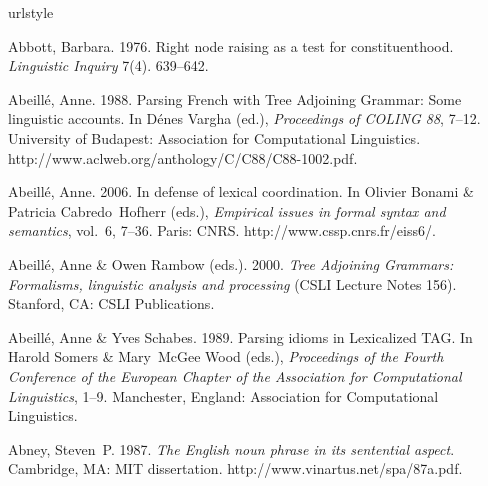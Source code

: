\providecommand{\noopsort}[1]{} \providecommand*{\donothing}[1]{}
  \providecommand*{\printsecond}[2]{#2}
\begin{thebibliography}{1420}
\providecommand{\natexlab}[1]{#1}
\providecommand{\url}[1]{#1}
\providecommand{\urlprefix}{}
\expandafter\ifx\csname urlstyle\endcsname\relax
  \providecommand{\doi}[1]{doi:\discretionary{}{}{}#1}\else
  \providecommand{\doi}{doi:\discretionary{}{}{}\begingroup
  \urlstyle{rm}\Url}\fi

\makeatletter

    \@clubpenalty \clubpenalty
\makeatother

  
Abbott, Barbara. 1976.
\newblock Right node raising as a test for constituenthood.
\newblock \emph{Linguistic Inquiry} 7(4). 639--642.

Abeill{\'e}, Anne. 1988.
\newblock Parsing {French} with {Tree Adjoining Grammar}: {Some} linguistic
  accounts.
\newblock In D{\'e}nes Vargha (ed.), \emph{Proceedings of {COLING} 88}, 7--12.
  University of Budapest: Association for Computational Linguistics.
\newblock \urlprefix\url{http://www.aclweb.org/anthology/C/C88/C88-1002.pdf}.

Abeill{\'e}, Anne. 2006.
\newblock In defense of lexical coordination.
\newblock In Olivier Bonami \& Patricia Cabredo~Hofherr (eds.), \emph{Empirical
  issues in formal syntax and semantics}, vol.~6, 7--36. Paris: CNRS.
\newblock \urlprefix\url{http://www.cssp.cnrs.fr/eiss6/}.

Abeill{\'e}, Anne \& Owen Rambow (eds.). 2000.
\newblock \emph{{Tree Adjoining Grammars}: Formalisms, linguistic analysis and
  processing} (CSLI Lecture Notes 156).
\newblock Stanford, CA: CSLI Publications.

Abeill{\'e}, Anne \& Yves Schabes. 1989.
\newblock Parsing idioms in {Lexicalized TAG}.
\newblock In Harold Somers \& Mary~McGee Wood (eds.), \emph{Proceedings of the
  {Fourth Conference of the European Chapter of the Association for
  Computational Linguistics}}, 1--9. Manchester, England: Association for
  Computational Linguistics.

Abney, Steven~P. 1987.
\newblock \emph{The {English} noun phrase in its sentential aspect}.
\newblock Cambridge, MA: MIT dissertation.
\newblock \urlprefix\url{http://www.vinartus.net/spa/87a.pdf}.


\end{thebibliography}
